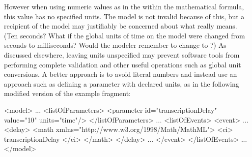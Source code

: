 However when using numeric values as in  the  within 
the mathematical formula, this value has no specified units.  The model is 
not invalid because of this, but
a recipient of the model may justifiably be concerned about what
 really means.  (Ten seconds?  What if the global units of
time on the model were changed from seconds to milliseconds?
Would the modeler remember to change  to ?)
As discussed elsewhere, leaving units unspecified may prevent
software tools from performing complete validation and other
useful operations such as global unit conversions.  A better
approach is to avoid literal numbers and instead use an approach
such as defining a parameter with declared units, as in the
following modified version of the example fragment:

\begin{example}
<model>
    ...
    <listOfParameters>
        <parameter id="transcriptionDelay" value="10" units="time"/>
    </listOfParameters>
    ...
    <listOfEvents>
        <event>
            ...
            <delay>
                <math xmlns="http://www.w3.org/1998/Math/MathML">
                    <ci> transcriptionDelay </ci>
                </math>
            </delay>
            ...
        </event>
    </listOfEvents>
    ...
</model>
\end{example}
